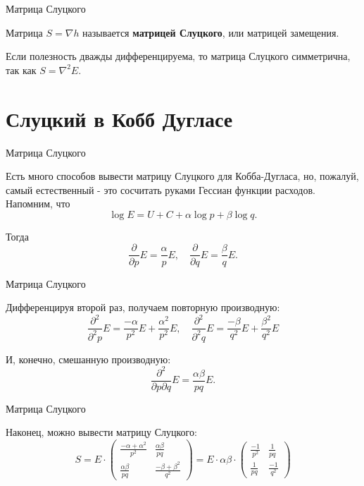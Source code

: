 \documentclass{beamer}
\begin{document}
\begin{frame}{Матрица Слуцкого}

\begin{definition}
Матрица $S = \nabla h$ называется \textbf{матрицей Слуцкого}, или матрицей замещения.
\end{definition}

\begin{lemma}
Если полезность дважды дифференцируема, то матрица Слуцкого симметрична, так как $S = \nabla^2 E$.
\end{lemma}

\end{frame}

\section{Слуцкий в Кобб Дугласе}

\begin{frame}{Матрица Слуцкого}

Есть много способов вывести матрицу Слуцкого для Кобба-Дугласа, но, пожалуй, самый естественный - это сосчитать руками Гессиан функции расходов. Напомним, что
$$ \log E = U + C + \alpha \log p + \beta \log q.$$

Тогда 
$$ \frac{\partial}{\partial p} E = \frac{\alpha}{p} E, \quad \frac{\partial}{\partial q} E = \frac{\beta}{q} E.$$

\end{frame}

\begin{frame}{Матрица Слуцкого}

Дифференцируя второй раз, получаем повторную производную:
$$ \frac{\partial^2}{\partial^2 p} E = \frac{-\alpha}{p^2} E + \frac{\alpha^2}{p^2} E, \quad \frac{\partial^2}{\partial^2 q} E = \frac{-\beta}{q^2} E + \frac{\beta^2}{q^2} E$$

И, конечно, смешанную производную:
$$ \frac{\partial^2}{\partial p \partial q} E = \frac{\alpha \beta}{p q} E.$$

\end{frame}

\begin{frame}{Матрица Слуцкого}

Наконец, можно вывести матрицу Слуцкого:
$$ S = 
E \cdot 
\begin{pmatrix} 
\frac{-\alpha + \alpha^2}{p^2} & \frac{\alpha \beta}{p q} \\
\frac{\alpha \beta}{p q} & \frac{-\beta +\beta^2}{q^2}
\end{pmatrix} = 
E \cdot \alpha \beta \cdot
\begin{pmatrix} 
\frac{-1}{p^2} & \frac{1}{p q} \\
\frac{1}{p q} & \frac{-1}{q^2}
\end{pmatrix}
$$
\end{frame}
\end{document}
